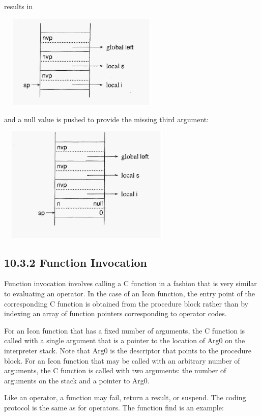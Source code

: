 \noindent results in

\ \  \includegraphics[width=2.8846in,height=1.7661in]{ib-img/ib-img082.jpg} 

and a null value is pushed to provide the missing third argument:

\ \  \includegraphics[width=3.0984in,height=2.1701in]{ib-img/ib-img083.jpg} 

\subsection[10.3.2 Function Invocation]{10.3.2 Function Invocation}

Function invocation involves calling a C function in a fashion that is
very similar to evaluating an operator. In the case of an Icon
function, the entry point of the corresponding C function is obtained
from the procedure block rather than by indexing an array of function
pointers corresponding to operator codes.

For an Icon function that has a fixed number of arguments, the C
function is called with a single argument that is a pointer to the
location of Arg0 on the interpreter stack. Note that Arg0 is the
descriptor that points to the procedure block. For an Icon function
that may be called with an arbitrary number of arguments, the C
function is called with two arguments: the number of arguments on the
stack and a pointer to Arg0.

Like an operator, a function may fail, return a result, or
suspend. The coding protocol is the same as for operators.  The
function find is an example:


